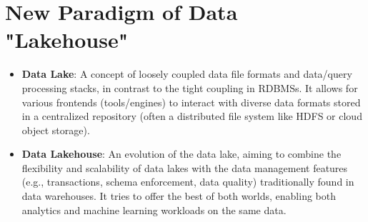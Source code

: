 \documentclass{article}
\begin{document}
\section*{New Paradigm of Data "Lakehouse"}
\begin{itemize}
    \item \textbf{Data Lake}: A concept of loosely coupled data file formats and data/query processing stacks, in contrast to the tight coupling in RDBMSs. It allows for various frontends (tools/engines) to interact with diverse data formats stored in a centralized repository (often a distributed file system like HDFS or cloud object storage).
    \item \textbf{Data Lakehouse}: An evolution of the data lake, aiming to combine the flexibility and scalability of data lakes with the data management features (e.g., transactions, schema enforcement, data quality) traditionally found in data warehouses. It tries to offer the best of both worlds, enabling both analytics and machine learning workloads on the same data.
\end{itemize}
\end{document}
